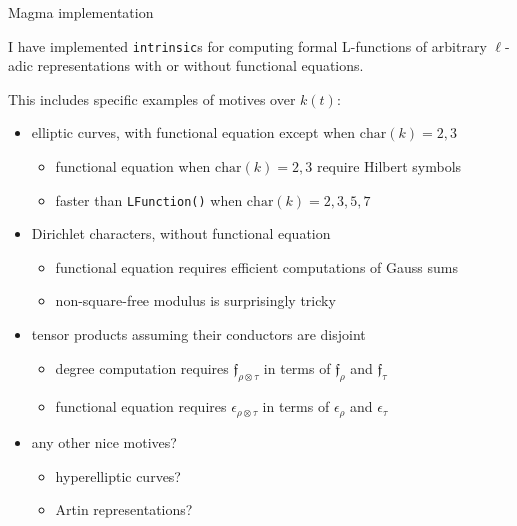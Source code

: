 \documentclass[10pt]{beamer}
\begin{document}
\begin{frame}[t]{Magma implementation}

I have implemented \texttt{intrinsic}s for computing formal L-functions of arbitrary $ \ell $-adic representations with or without functional equations.

\pause

\vspace{0.5cm} This includes specific examples of motives over $ k(t) $:
\begin{itemize}
\item elliptic curves, with functional equation except when $ \mathrm{char}(k) = 2, 3 $
\begin{itemize}
\item functional equation when $ \mathrm{char}(k) = 2, 3 $ require Hilbert symbols
\item faster than \texttt{LFunction()} when $ \mathrm{char}(k) = 2, 3, 5, 7 $
\end{itemize}

\pause

\item Dirichlet characters, without functional equation
\begin{itemize}
\item functional equation requires efficient computations of Gauss sums
\item non-square-free modulus is surprisingly tricky
\end{itemize}

\pause

\item tensor products assuming their conductors are disjoint
\begin{itemize}
\item degree computation requires $ \mathfrak{f}_{\rho \otimes \tau} $ in terms of $ \mathfrak{f}_\rho $ and $ \mathfrak{f}_\tau $
\item functional equation requires $ \epsilon_{\rho \otimes \tau} $ in terms of $ \epsilon_\rho $ and $ \epsilon_\tau $
\end{itemize}

\pause

\item any other nice motives?
\begin{itemize}
\item hyperelliptic curves?
\item Artin representations?
\end{itemize}
\end{itemize}

\end{frame}
\end{document}
